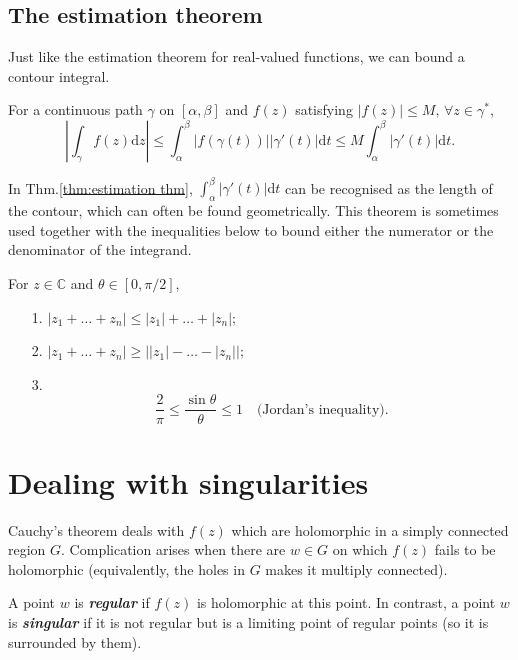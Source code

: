 \documentclass{article}
\begin{document}
\subsection{The estimation theorem}
Just like the estimation theorem for real-valued functions, we can bound a contour integral.
\begin{frm-thm} \label{thm:estimation thm}
    For a continuous path $\gamma $ on $[\alpha ,\beta ]$ and $f(z)$ satisfying $\left\vert f(z) \right\vert \leq M, \, \forall z \in \gamma^{*}$, 
    \[
        \left\vert \int_\gamma f(z) \mathrm{d}z  \right\vert 
        \leq  \int_{\alpha}^{\beta} \left\vert  f(\gamma(t))\right\vert \left\vert \gamma'(t) \right\vert  \mathrm{d}t 
        \leq M \int_{\alpha}^{\beta} \left\vert \gamma'(t) \right\vert  \mathrm{d}t. 
     \]
\end{frm-thm}
In Thm.\eqref{thm:estimation thm}, $\int_{\alpha}^{\beta} \left\vert \gamma'(t) \right\vert  \mathrm{d}t$ can be recognised as the length of the contour, which can often be found geometrically. This theorem is sometimes used together with the inequalities below to bound either the numerator or the denominator of the integrand.
\begin{frm-res}
    For $z \in \mathbb{C}$ and $\theta  \in [0,\pi /2],$
    \begin{itemize}
        \item[1.] \(
            \left\vert z_1 + \ldots  + z_n \right\vert \leq \left\vert z_1 \right\vert +\ldots  + \left\vert z_n \right\vert;
        \)
        \item[2.] 
        \( 
            \left\vert z_1 + \ldots  + z_n \right\vert \geq \left\vert \left\vert z_1 \right\vert -\ldots  -\left\vert z_n \right\vert  \right\vert ;
        \)
        \item[3.] 
        \[
            \frac{2}{\pi } \leq  \frac{\sin {\theta }}{\theta } \leq  1 \quad \text{(Jordan's inequality)}. 
        \]
    \end{itemize}
\end{frm-res}
\section{Dealing with singularities}
Cauchy's theorem deals with $f(z)$ which are holomorphic in a simply connected region $G$. Complication arises when there are $w \in G$ on which $f(z)$ fails to be holomorphic (equivalently, the holes in $G$ makes it multiply connected).

A point $w$ is \textit{\textbf{regular}} if $f(z)$ is holomorphic at this point. In contrast, a point $w$ is \textit{\textbf{singular}} if it is not regular but is a limiting point of regular points (so it is surrounded by them). 
\end{document}

